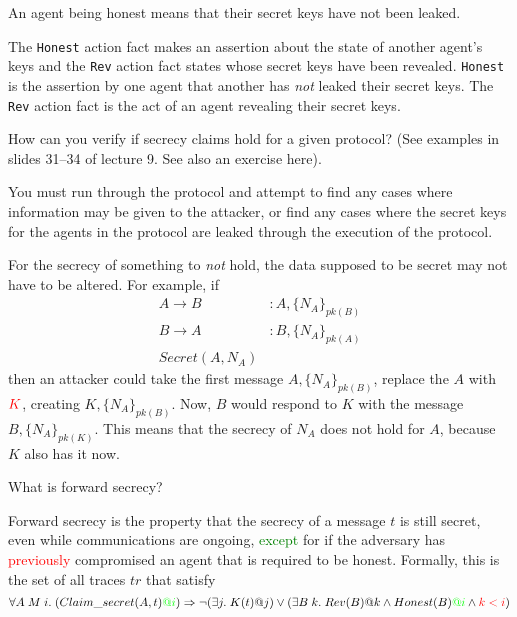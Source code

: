 \begin{questions}
\begin{solution}
    An agent being honest means that their secret keys have not been leaked.

    The \texttt{Honest} action fact makes an assertion about the state of another agent's keys and the \texttt{Rev} action fact states whose secret keys have been revealed.
    \texttt{Honest} is the assertion by one agent that another has \emph{not} leaked their secret keys.
    The \texttt{Rev} action fact is the act of an agent revealing their secret keys.
  \end{solution}

\question{} How can you verify if secrecy claims hold for a given protocol? (See examples in slides 31--34 of lecture 9. See also an exercise here).
  \begin{solution}
    You must run through the protocol and attempt to find any cases where information may be given to the attacker, or find any cases where the secret keys for the agents in the protocol are leaked through the execution of the protocol.

    For the secrecy of something to \emph{not} hold, the data supposed to be secret may not have to be altered.
    For example, if
    \begin{align*}
      A \rightarrow B &: A, {\lbrace N_{A} \rbrace}_{pk(B)} \\
      B \rightarrow A &: B, {\lbrace N_{A} \rbrace}_{pk(A)} \\
      Secret(A, N_{A})
    \end{align*}
    then an attacker could take the first message $A, {\lbrace N_{A} \rbrace}_{pk(B)}$, replace the $A$ with $\textcolor{red}{K}$, creating $K, {\lbrace N_{A} \rbrace}_{pk(B)}$.
    Now, $B$ would respond to $K$ with the message $B, {\lbrace N_{A} \rbrace}_{pk(K)}$.
    This means that the secrecy of $N_{A}$ does not hold for $A$, because $K$ also has it now.
  \end{solution}

\question{} What is forward secrecy?
  \begin{solution}
    Forward secrecy is the property that the secrecy of a message $t$ is still secret, even while communications are ongoing, \textcolor{green}{except} for if the adversary has \textcolor{red}{previously} compromised an agent that is required to be honest.
    Formally, this is the set of all traces $tr$ that satisfy
    \begin{equation}\label{eq:Forward_Secrecy}
      \forall A \; M\; i.\; (Claim\_secret(A, t)\textcolor{green}{@i}) \Rightarrow \neg(\exists j.\; K(t)@j) \vee (\exists B\; k.\; Rev(B)@k \wedge Honest(B)\textcolor{green}{@i} \wedge \textcolor{red}{k<i})
    \end{equation}
  \end{solution}


\end{questions}
